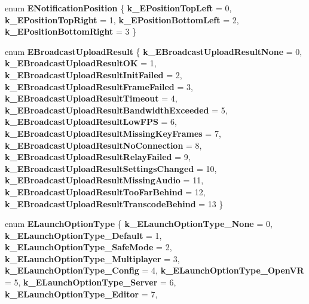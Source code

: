 \begin{DoxyCompactItemize}
enum {\bfseries E\+Notification\+Position} \{ {\bfseries k\+\_\+\+E\+Position\+Top\+Left} = 0, 
{\bfseries k\+\_\+\+E\+Position\+Top\+Right} = 1, 
{\bfseries k\+\_\+\+E\+Position\+Bottom\+Left} = 2, 
{\bfseries k\+\_\+\+E\+Position\+Bottom\+Right} = 3
 \}
\item 
\mbox{\label{namespace_valve_1_1_steamworks_a3da1de8e0d18df37e18ef635d7a78c1a}} 
enum {\bfseries E\+Broadcast\+Upload\+Result} \{ \newline
{\bfseries k\+\_\+\+E\+Broadcast\+Upload\+Result\+None} = 0, 
{\bfseries k\+\_\+\+E\+Broadcast\+Upload\+Result\+OK} = 1, 
{\bfseries k\+\_\+\+E\+Broadcast\+Upload\+Result\+Init\+Failed} = 2, 
{\bfseries k\+\_\+\+E\+Broadcast\+Upload\+Result\+Frame\+Failed} = 3, 
\newline
{\bfseries k\+\_\+\+E\+Broadcast\+Upload\+Result\+Timeout} = 4, 
{\bfseries k\+\_\+\+E\+Broadcast\+Upload\+Result\+Bandwidth\+Exceeded} = 5, 
{\bfseries k\+\_\+\+E\+Broadcast\+Upload\+Result\+Low\+F\+PS} = 6, 
{\bfseries k\+\_\+\+E\+Broadcast\+Upload\+Result\+Missing\+Key\+Frames} = 7, 
\newline
{\bfseries k\+\_\+\+E\+Broadcast\+Upload\+Result\+No\+Connection} = 8, 
{\bfseries k\+\_\+\+E\+Broadcast\+Upload\+Result\+Relay\+Failed} = 9, 
{\bfseries k\+\_\+\+E\+Broadcast\+Upload\+Result\+Settings\+Changed} = 10, 
{\bfseries k\+\_\+\+E\+Broadcast\+Upload\+Result\+Missing\+Audio} = 11, 
\newline
{\bfseries k\+\_\+\+E\+Broadcast\+Upload\+Result\+Too\+Far\+Behind} = 12, 
{\bfseries k\+\_\+\+E\+Broadcast\+Upload\+Result\+Transcode\+Behind} = 13
 \}
\item 
\mbox{\label{namespace_valve_1_1_steamworks_add97112e198da7ba86fbfef3c3e68999}} 
enum {\bfseries E\+Launch\+Option\+Type} \{ \newline
{\bfseries k\+\_\+\+E\+Launch\+Option\+Type\+\_\+\+None} = 0, 
{\bfseries k\+\_\+\+E\+Launch\+Option\+Type\+\_\+\+Default} = 1, 
{\bfseries k\+\_\+\+E\+Launch\+Option\+Type\+\_\+\+Safe\+Mode} = 2, 
{\bfseries k\+\_\+\+E\+Launch\+Option\+Type\+\_\+\+Multiplayer} = 3, 
\newline
{\bfseries k\+\_\+\+E\+Launch\+Option\+Type\+\_\+\+Config} = 4, 
{\bfseries k\+\_\+\+E\+Launch\+Option\+Type\+\_\+\+Open\+VR} = 5, 
{\bfseries k\+\_\+\+E\+Launch\+Option\+Type\+\_\+\+Server} = 6, 
{\bfseries k\+\_\+\+E\+Launch\+Option\+Type\+\_\+\+Editor} = 7, 
\newline

\end{DoxyCompactItemize}
